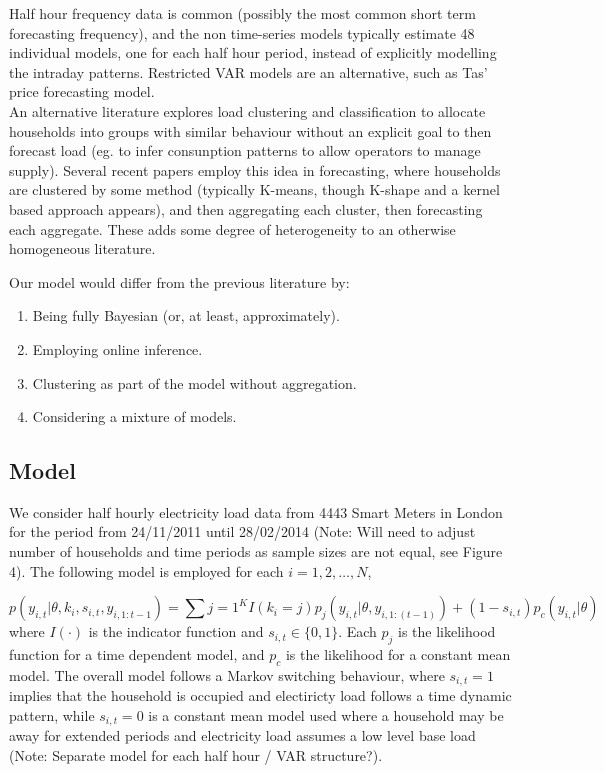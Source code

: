 \documentclass[12pt,a4paper]{article}\usepackage[]{graphicx}\usepackage[]{color}
\begin{document}
Half hour frequency data is common (possibly the most common short term forecasting frequency), and the non time-series models typically estimate 48 individual models, one for each half hour period, instead of explicitly modelling the intraday patterns. Restricted VAR models are an alternative, such as Tas' price forecasting model.
\\

An alternative literature explores load clustering and classification to allocate households into groups with similar behaviour without an explicit goal to then forecast load (eg. to infer consunption patterns to allow operators to manage supply). Several recent papers employ this idea in forecasting, where households are clustered by some method (typically K-means, though K-shape and a kernel based approach appears), and then aggregating each cluster, then forecasting each aggregate. These adds some degree of heterogeneity to an otherwise homogeneous literature.

Our model would differ from the previous literature by:
\begin{enumerate}
\item Being fully Bayesian (or, at least, approximately).
\item Employing online inference.
\item Clustering as part of the model without aggregation.
\item Considering a mixture of models.
\end{enumerate}

\subsection{Model}

We consider half hourly electricity load data from 4443 Smart Meters in London for the period from 24/11/2011 until 28/02/2014 (Note: Will need to adjust number of households and time periods as sample sizes are not equal, see Figure 4). The following model is employed for each $i = 1, 2, \dots, N$, 

\begin{equation}
p(y_{i, t} | \theta, k_i, s_{i, t}, y_{i, 1:t-1}) = \sum{j=1}^K I(k_{i} = j) p_j(y_{i, t} | \theta, y_{i, 1:(t-1)}) + (1 - s_{i, t}) p_c (y_{i, t} | \theta)
\end{equation}
where $I(\cdot)$ is the indicator function and $s_{i, t} \in \{0, 1\}$. Each $p_j$ is the likelihood function for a time dependent model, and $p_c$ is the likelihood for a constant mean model. The overall model follows a Markov switching behaviour, where $s_{i, t} = 1$ implies that the household is occupied and electiricty load follows a time dynamic pattern, while $s_{i, t} = 0$ is a constant mean model used where a household may be away for extended periods and electricity load assumes a low level base load (Note: Separate model for each half hour / VAR structure?).  
\\
\end{document}
